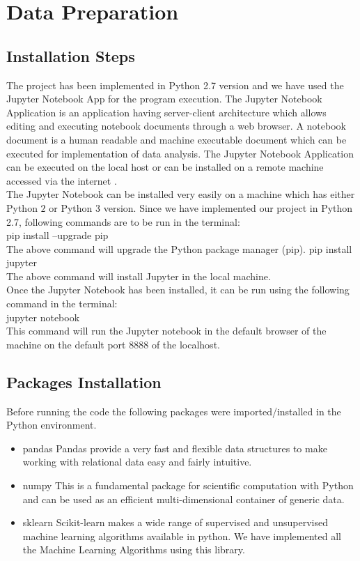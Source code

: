 \section{Data Preparation}

\subsection{Installation Steps}
The project has been implemented in Python 2.7 version and we have used the Jupyter Notebook App for the program execution. The Jupyter Notebook Application is an application having server-client architecture which allows editing and executing notebook documents through a web browser. A notebook document is a human readable and machine executable document which can be executed for implementation of data analysis. The Jupyter Notebook Application can be executed on the local host or can be installed on a remote machine accessed via the internet \cite{link15}. \\
The Jupyter Notebook can be installed very easily on a machine which has either Python $2$ or Python $3$ version. Since we have implemented our project in Python 2.7, following commands are to be run in the terminal:\\
pip install --upgrade pip \\
The above command will upgrade the Python package manager (pip).
pip install jupyter \\
The above command will install Jupyter in the local machine.\\
Once the Jupyter Notebook has been installed, it can be run using the following command in the terminal:\\
jupyter notebook\\
This command will run the Jupyter notebook in the default browser of the machine on the default port $8888$ of the localhost.

\subsection{Packages Installation}
Before running the code the following packages were imported/installed in the Python environment.

\begin{itemize}
    \item pandas
    Pandas provide a very fast and flexible data structures to make working with relational data easy and fairly intuitive.
    \item numpy
    This is a fundamental package for scientific computation with Python and can be used as an efficient multi-dimensional container of generic data.
    \item sklearn
    Scikit-learn makes a wide range of supervised and unsupervised machine learning algorithms  available in python. We have implemented all the Machine Learning Algorithms using this library.
\end{itemize}


